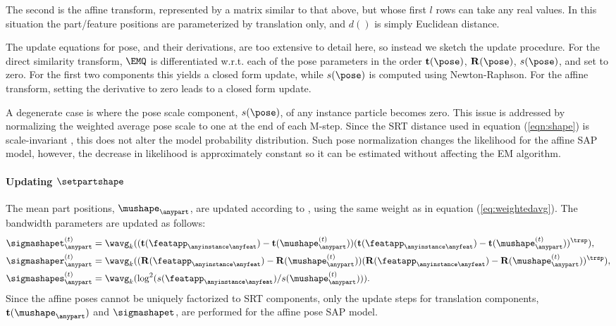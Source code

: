 The second is the affine transform, represented by a matrix similar to that above, but whose first $l$ rows can take any real values. In this situation the part/feature positions are parameterized by translation only, and $d()$ is simply Euclidean distance.

The update equations for pose, and their derivations, are too extensive to detail here, so instead we sketch the update procedure. For the direct similarity transform, $\EMQ$ is differentiated w.r.t. each of the pose parameters in the order $\mathbf{t}(\pose)$, $\mathbf{R}(\pose)$, $s(\pose)$, and set to zero. For the first two components this yields a closed form update, while $s(\pose)$ is computed using Newton-Raphson. For the affine transform, setting the derivative to zero leads to a closed form update.

A degenerate case is where the pose scale component, $s(\pose)$, of any instance particle becomes zero. This issue is addressed by normalizing the weighted average pose scale to one at the end of each M-step. Since the SRT distance used in equation (\ref{eqn:shape}) is scale-invariant \cite{Pham2011}, this does not alter the model probability distribution. Such pose normalization changes the likelihood for the affine SAP model, however, the decrease in likelihood is approximately constant so it can be estimated without affecting the EM algorithm.

\paragraph{Updating $\setpartshape$}
The mean part positions, $\mushape_\anypart$, are updated according to \cite{Pham2011}, using the same weight as in equation (\ref{eq:weightedavg}). The bandwidth parameters are updated as follows:
\begin{align}
\sigmashapet_{\anypart}^{(t)} & = \wavg_k((\mathbf{t}(\featapp_{\anyinstance\anyfeat}) - \mathbf{t}(\mushape_{\anypart}^{(t)}))(\mathbf{t}(\featapp_{\anyinstance\anyfeat}) - \mathbf{t}(\mushape_{\anypart}^{(t)}))^\trsp),\label{eq:updatemeant}\\ 
\sigmashaper_{\anypart}^{(t)} & = \wavg_k((\mathbf{R}(\featapp_{\anyinstance\anyfeat}) - \mathbf{R}(\mushape_{\anypart}^{(t)}))(\mathbf{R}(\featapp_{\anyinstance\anyfeat}) - \mathbf{R}(\mushape_{\anypart}^{(t)}))^\trsp),\label{eq:updatedmeanr}\\
\sigmashapes_{\anypart}^{(t)} & = \wavg_k(\log^2(s(\featapp_{\anyinstance\anyfeat})/s(\mushape_{\anypart}^{(t)}))). \label{eq:updatemeans}
\end{align}
Since the affine poses cannot be uniquely factorized to SRT components, only the update steps for translation components, \ie $\mathbf{t}(\mushape_\anypart)$ and $\sigmashapet$, are performed for the affine pose SAP model. 

